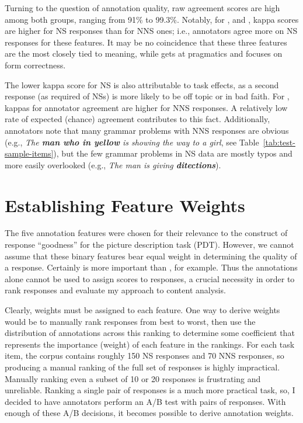 Turning to the question of annotation quality, raw agreement scores are high among both groups, ranging from 91\% to 99.3\%. Notably, for ,   and , kappa scores are higher for NS responses than for NNS ones; i.e., annotators agree more on NS responses for these features. It may be no coincidence that these three features are the most closely tied to meaning, while  gets at pragmatics and  focuses on form correctness.

The lower kappa score for NS  is also attributable to task effects, as a second response (as required of NSs) is more likely to be off topic or in bad faith. For , kappas for annotator agreement are higher for NNS responses. A relatively low rate of expected (chance) agreement contributes to this fact. Additionally, annotators note that many grammar problems with NNS responses are obvious (e.g., \textit{The \textbf{man who in yellow} is showing the way to a girl}, see Table~\ref{tab:test-sample-items}), but the few grammar problems in NS data are mostly typos and more easily overlooked (e.g., \textit{The man is giving \textbf{ditections}}).

\section{Establishing Feature Weights}

The five annotation features were chosen for their relevance to the construct of response ``goodness'' for the picture description task (PDT). However, we cannot assume that these binary features bear equal weight in determining the quality of a response. Certainly  is more important than , for example. Thus the annotations alone cannot be used to assign scores to responses, a crucial necessity in order to rank responses and evaluate my approach to content analysis.

Clearly, weights must be assigned to each feature. One way to derive weights would be to manually rank responses from best to worst, then use the distribution of annotations across this ranking to determine some coefficient that represents the importance (weight) of each feature in the rankings. For each task item, the corpus contains roughly 150 NS responses and 70 NNS responses, so producing a manual ranking of the full set of responses is highly impractical. Manually ranking even a subset of 10 or 20 responses is frustrating and unreliable. Ranking a single pair of responses is a much more practical task, so, I decided to have annotators perform an A/B test with pairs of responses. With enough of these A/B decisions,  it becomes possible to derive annotation weights.

